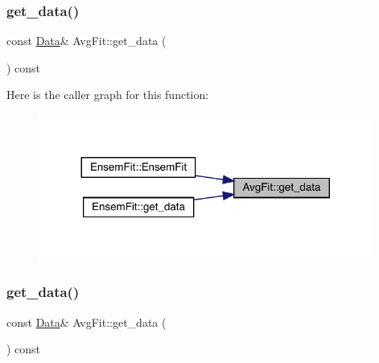 \mbox{\label{classAvgFit_aab0805acd73d39676069431db93684ed}} 
\subsubsection{\texorpdfstring{get\_data()}{get\_data()}\hspace{0.1cm}{\footnotesize\ttfamily [1/2]}}
{\footnotesize\ttfamily const \mbox{\hyperlink{classData}{Data}}\& Avg\+Fit\+::get\+\_\+data (\begin{DoxyParamCaption}{ }\end{DoxyParamCaption}) const\hspace{0.3cm}{\ttfamily [inline]}}

Here is the caller graph for this function\+:
\nopagebreak
\begin{figure}[H]
\begin{center}
\leavevmode
\includegraphics[width=311pt]{d4/dfd/classAvgFit_aab0805acd73d39676069431db93684ed_icgraph}
\end{center}
\end{figure}
\mbox{\label{classAvgFit_aab0805acd73d39676069431db93684ed}} 
\subsubsection{\texorpdfstring{get\_data()}{get\_data()}\hspace{0.1cm}{\footnotesize\ttfamily [2/2]}}
{\footnotesize\ttfamily const \mbox{\hyperlink{classData}{Data}}\& Avg\+Fit\+::get\+\_\+data (\begin{DoxyParamCaption}{ }\end{DoxyParamCaption}) const\hspace{0.3cm}{\ttfamily [inline]}}

\mbox{\label{classAvgFit_af9fc84ffb95d3b08daa27ee377892537}} 
